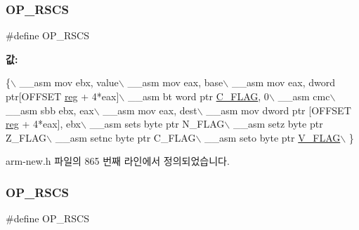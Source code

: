 \subsubsection{\texorpdfstring{O\+P\+\_\+\+R\+S\+CS}{OP\_RSCS}\hspace{0.1cm}{\footnotesize\ttfamily [1/2]}}
{\footnotesize\ttfamily \#define O\+P\+\_\+\+R\+S\+CS}

{\bfseries 값\+:}
\begin{DoxyCode}
\{\(\backslash\)
        \_\_asm mov ebx, value\(\backslash\)
        \_\_asm mov eax, base\(\backslash\)
        \_\_asm mov eax, dword ptr[OFFSET \mbox{\hyperlink{_g_b_a_8h_ae29faba89509024ffd1a292badcedf2d}{reg}} + 4*eax]\(\backslash\)
        \_\_asm bt word ptr \mbox{\hyperlink{_g_b_8h_aa29c80f7f7f901ec7a2c57887f56585d}{C\_FLAG}}, 0\(\backslash\)
        \_\_asm cmc\(\backslash\)
        \_\_asm sbb ebx, eax\(\backslash\)
        \_\_asm mov eax, dest\(\backslash\)
        \_\_asm mov dword ptr [OFFSET \mbox{\hyperlink{_g_b_a_8h_ae29faba89509024ffd1a292badcedf2d}{reg}} + 4*eax], ebx\(\backslash\)
        \_\_asm sets byte ptr N\_FLAG\(\backslash\)
        \_\_asm setz byte ptr Z\_FLAG\(\backslash\)
        \_\_asm setnc byte ptr C\_FLAG\(\backslash\)
        \_\_asm seto byte ptr \mbox{\hyperlink{_g_b_a_8h_a11a0e7b14a93be5eb2720b0151900919}{V\_FLAG}}\(\backslash\)
      \}
\end{DoxyCode}


arm-\/new.\+h 파일의 865 번째 라인에서 정의되었습니다.

\mbox{\label{_g_b_a_8cpp_a2c5590f712403b7ef57c57de43662185}} 
\subsubsection{\texorpdfstring{O\+P\+\_\+\+R\+S\+CS}{OP\_RSCS}\hspace{0.1cm}{\footnotesize\ttfamily [2/2]}}
{\footnotesize\ttfamily \#define O\+P\+\_\+\+R\+S\+CS}

